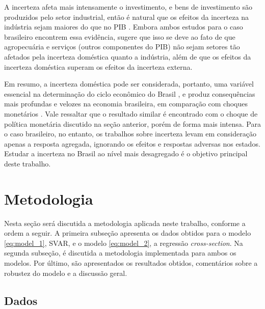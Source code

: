 A incerteza afeta mais intensamente o investimento, e bens de investimento são produzidos pelo setor industrial, então é natural que os efeitos da incerteza na indústria sejam maiores do que no \gls{PIB} \cite{barboza2018efeitos}. Embora ambos estudos para o caso brasileiro \cite{costa2014incerteza, barboza2018efeitos} encontrem essa evidência,  sugere que isso se deve ao fato de que agropecuária e serviços (outros componentes do \gls{PIB}) não sejam setores tão afetados pela incerteza doméstica quanto a indústria, além de que os efeitos da incerteza doméstica superam os efeitos da incerteza externa.
\par 

Em resumo, a incerteza doméstica pode ser considerada, portanto, uma variável essencial na determinação do ciclo econômico do Brasil \cite{barboza2018efeitos}, e produz consequências mais profundas e velozes na economia brasileira, em comparação com choques monetários
\cite{costa2014incerteza}. Vale ressaltar que o resultado similar é encontrado com o choque de política monetária discutido na seção anterior, porém de forma mais intensa. Para o caso brasileiro, no entanto, os trabalhos sobre incerteza levam em consideração apenas a resposta agregada, ignorando os efeitos e respostas adversas nos estados. Estudar a incerteza no Brasil ao nível mais desagregado é o objetivo principal deste trabalho.

\section{Metodologia}
Nesta seção será discutida a metodologia aplicada neste trabalho, conforme a ordem a seguir. A primeira subseção apresenta os dados obtidos para o modelo \ref{eq:model_1}, \gls{SVAR}, e o modelo \ref{eq:model_2}, a regressão \textit{cross-section}. Na segunda subseção, é discutida a metodologia implementada para ambos os modelos. Por último, são apresentados os resultados obtidos, comentários sobre a robustez do modelo e a discussão geral.

\subsection{Dados}
